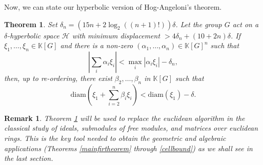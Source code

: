 \documentclass[11pt,letterpaper]{amsart}
\newtheorem{theorem}{Theorem}
\newtheorem*{remark}{Remark}
\begin{document}
Now, we can state our hyperbolic version of Hog-Angeloni's theorem. 
\begin{theorem}
\label{intromaintheorem}
Set $\delta_n=(15n+2\log_2((n+1)!))\delta$. Let the group $G$ act on a $\delta$-hyperbolic space $\mathcal H$ with minimum displacement $>4\delta_n+(10+2n)\delta$. If $\xi_1,\dots,\xi_n\in\mathbb K[G]$ and there is a non-zero $(\alpha_1,\dots,\alpha_n)\in\mathbb K[G]^n$ such that 
$$
\left|\sum_i\alpha_i\xi_i\right|<\max_i|\alpha_i\xi_i|-\delta_n, 
$$
then, up to re-ordering, there exist $\beta_2,\dots,\beta_n$ in $\mathbb K[G]$ such that
$$
\mathrm{diam} \left(\xi_1+\sum_{i = 2}^n \beta_i \xi_i\right)<\mathrm{diam}(\xi_1)-\delta.
$$
\end{theorem}
\begin{remark}
Theorem \ref{intromaintheorem} will be used to replace the euclidean algorithm in the classical study of ideals, submodules of free modules, and matrices over euclidean rings. This is the key tool needed to obtain the geometric and algebraic applications (Theorems \ref{mainfirtheorem} through \ref{cellbound}) as we shall see in the last section. 
\end{remark}

\end{document}
